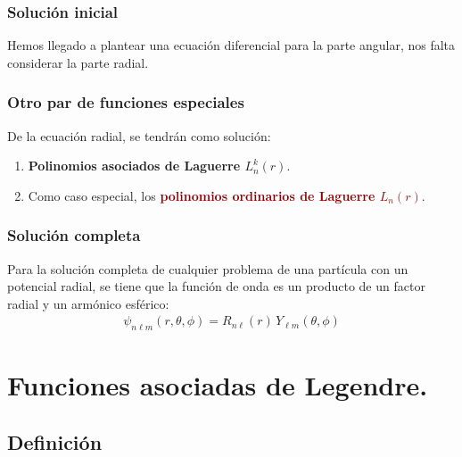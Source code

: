 \documentclass[12pt]{beamer}
\begin{document}
\begin{frame}
\frametitle{Solución inicial}
Hemos llegado a plantear una ecuación diferencial para la parte angular, \pause nos falta considerar la parte radial.
\end{frame}
\begin{frame}
\frametitle{Otro par de funciones especiales}
De  la ecuación radial, se tendrán como solución:
\begin{enumerate}[<+->]
\item \textbf{\textcolor{bole}{Polinomios asociados de Laguerre $L_{n}^{k} (r)$}}.
\item Como caso especial, los \textbf{\textcolor{darkred}{polinomios ordinarios de Laguerre $L_{n} (r)$}}.
\end{enumerate}
\end{frame}
\begin{frame}
\frametitle{Solución completa}
Para la solución completa de cualquier problema de una partícula con un potencial radial, se tiene que la función de onda es un producto de un factor radial y un armónico esférico:
\pause
\begin{align*}
\psi_{n \ell m} (r, \theta, \phi) = R_{n \ell} (r) \, Y_{\ell m} (\theta, \phi)
\end{align*}
\end{frame}


\section{Funciones asociadas de Legendre.}
\subsection{Definición}
\end{document}
